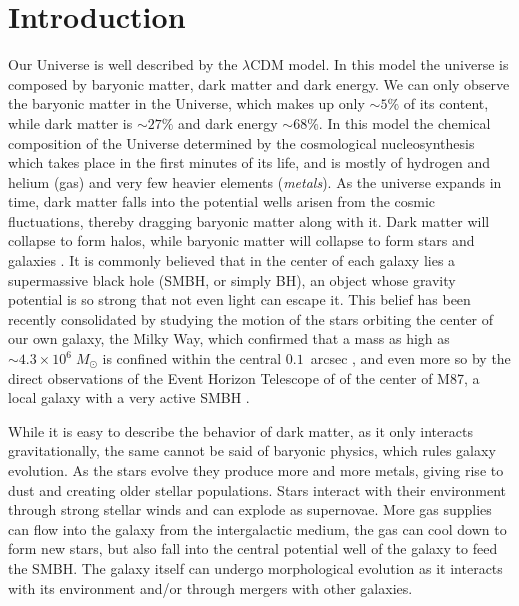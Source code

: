 \chapter{Introduction}


Our Universe is well described by the $\lambda$CDM %
model. In this model the universe is composed by baryonic matter, dark matter and dark energy. We can only observe the baryonic matter in the Universe, which makes up only $\sim 5\%$ of its content, while dark matter is $\sim 27\%$ and dark energy $\sim 68\%$. In this model the chemical composition of the Universe determined by the cosmological nucleosynthesis which takes place in the first minutes of its life, and is mostly of hydrogen and helium (gas) and very few heavier elements (\emph{metals}). As the universe expands in time, dark matter falls into the potential wells arisen from the cosmic fluctuations, thereby dragging baryonic matter along with it. Dark matter will collapse to form halos, while baryonic matter will collapse to form stars and galaxies \citep{2009ApJS..180..330K,2007ApJS..170..377S,2020A&A...641A...1P}. It is commonly believed that in the center of each galaxy lies a supermassive black hole (SMBH, or simply BH), an object whose gravity potential is so strong that not even light can escape it. This belief has been recently consolidated by studying the motion of the stars orbiting the center of our own galaxy, the Milky Way, which confirmed that a mass as high as $\sim4.3\times10^6 \;M_\odot$ is confined within the central $0.1$~arcsec \citep{2008ApJ...689.1044G,2019A&A...625L..10G,2021A&A...647A..59G}, and even more so by the direct observations of the Event Horizon Telescope of of the center of M87, a local galaxy with a very active SMBH \citep{2019ApJ...875L...5E}.

While it is easy to describe the behavior of dark matter, as it only interacts gravitationally, the same cannot be said of baryonic physics, which rules galaxy evolution. As the stars evolve they produce more and more metals, giving rise to dust and creating older stellar populations. Stars interact with their environment through strong stellar winds and can explode as supernovae. More gas supplies can flow into the galaxy from the intergalactic medium, the gas can cool down to form new stars, but also fall into the central potential well of the galaxy to feed the SMBH. The galaxy itself can undergo morphological evolution as it interacts with its environment and/or through mergers with other galaxies. 

